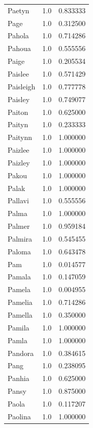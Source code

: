 \documentclass[
  letterpaper,
  DIV=11,
  numbers=noendperiod]{scrreprt}
\begin{document}
\begin{tabular}{lrr}
Paetyn          &   1.0 &   0.833333 \\
Page            &   1.0 &   0.312500 \\
Pahola          &   1.0 &   0.714286 \\
Pahoua          &   1.0 &   0.555556 \\
Paige           &   1.0 &   0.205534 \\
Paislee         &   1.0 &   0.571429 \\
Paisleigh       &   1.0 &   0.777778 \\
Paisley         &   1.0 &   0.749077 \\
Paiton          &   1.0 &   0.625000 \\
Paityn          &   1.0 &   0.233333 \\
Paitynn         &   1.0 &   1.000000 \\
Paizlee         &   1.0 &   1.000000 \\
Paizley         &   1.0 &   1.000000 \\
Pakou           &   1.0 &   1.000000 \\
Palak           &   1.0 &   1.000000 \\
Pallavi         &   1.0 &   0.555556 \\
Palma           &   1.0 &   1.000000 \\
Palmer          &   1.0 &   0.959184 \\
Palmira         &   1.0 &   0.545455 \\
Paloma          &   1.0 &   0.643478 \\
Pam             &   1.0 &   0.014577 \\
Pamala          &   1.0 &   0.147059 \\
Pamela          &   1.0 &   0.004955 \\
Pamelia         &   1.0 &   0.714286 \\
Pamella         &   1.0 &   0.350000 \\
Pamila          &   1.0 &   1.000000 \\
Pamla           &   1.0 &   1.000000 \\
Pandora         &   1.0 &   0.384615 \\
Pang            &   1.0 &   0.238095 \\
Panhia          &   1.0 &   0.625000 \\
Pansy           &   1.0 &   0.875000 \\
Paola           &   1.0 &   0.117207 \\
Paolina         &   1.0 &   1.000000 \\

\end{tabular}
\end{document}
